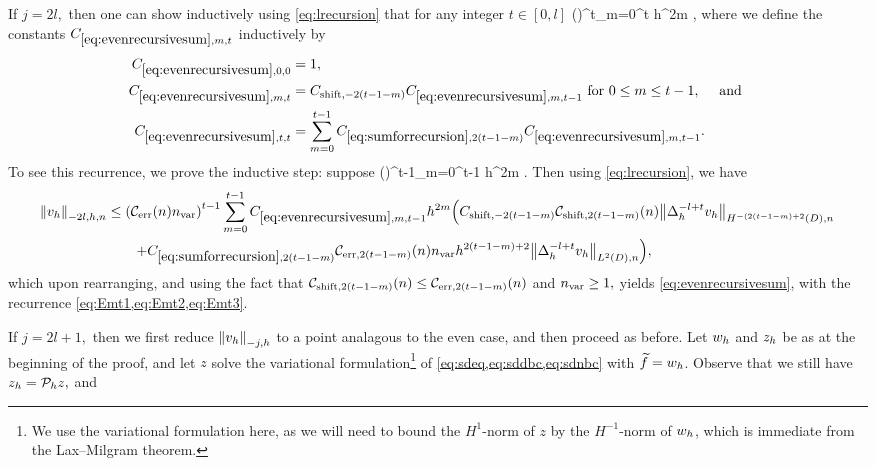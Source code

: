 If $j = 2l,$ then one can show inductively using \cref{eq:lrecursion} that for any integer $t \in [0,l]$
\beq\label{eq:evenrecursivesum}
 \leq \mleft(\En\nvar\mright)^t\sum_{m=0}^t  h^{2m}  ,
\eeq
where we define the constants $\Efn{m,t}$ inductively by
\begin{align}
\label{eq:Emt1}\Efn{0,0} &=1,\\
\label{eq:Emt2}\Efn{m,t} &= \Cshiftfn{2(t-1-m)} \Efn{m,t-1} \tfor 0 \leq m \leq t-1, \quad\tand\\
\label{eq:Emt3}\Efn{t,t} &= \sum_{m=0}^{t-1} \Csumrecfn{2(t-1-m)} \Efn{m,t-1}.
\end{align}
To see this recurrence, we prove the inductive step: suppose
\beqs
{} \leq \mleft(\En\nvar\mright)^{t-1}\sum_{m=0}^{t-1}  h^{2m} .
\eeqs
Then using \cref{eq:lrecursion}, we have
\begin{align*}
\Nfn{-2l,h,n}{\vh} &\leq \mleft(\En\nvar\mright)^{t-1}\sum_{m=0}^{t-1} \Efn{m,t-1} h^{2m} \mleft(\Cshiftfn{2(t-1-m)}\shiftn{2(t-1-m)} \NHnfn{-(2(t-1-m)+2}{D}{\Deltah^{-l+t} \vh}\mright.\\
&\quad\quad\mleft.+ \Csumrecfn{2(t-1-m)} \errn{2(t-1-m)} \nvar h^{2(t-1-m)+2} \NLtDn{\Deltah^{-l+t} \vh}\mright),
\end{align*}
which upon rearranging, and using the fact that $\shiftn{2(t-1-m)} \leq \errn{2(t-1-m)}$ and $n_{\mathrm{var}} \geq 1,$ yields \cref{eq:evenrecursivesum}, with the recurrence \cref{eq:Emt1,eq:Emt2,eq:Emt3}.

If $j=2l+1,$ then we first reduce $\Nfn{-j,h}{\vh}$ to a point analagous to the even case, and then proceed as before. Let $w_{h}$ and $z_{h}$ be as at the beginning of the proof, and let $z$ solve the variational formulation\footnote{We use the variational formulation here, as we will need to bound the $H^1$-norm of $z$ by the $H^{-1}$-norm of $w_{h}$, which is immediate from the Lax--Milgram theorem.}  of \cref{eq:sdeq,eq:sddbc,eq:sdnbc} with $\widetilde{f} = w_{h}$. Observe that we still have $z_{h} = \mathcal P_{h} z,$ and

